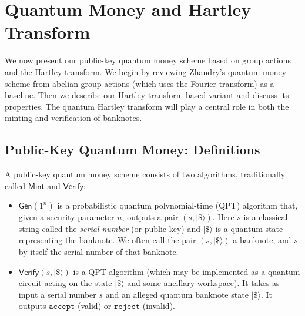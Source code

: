 \documentclass[12pt]{report}
\begin{document}





\chapter{Quantum Money and Hartley Transform}

We now present our public-key quantum money scheme based on group actions and the Hartley transform. We begin by reviewing Zhandry’s quantum money scheme from abelian group actions (which uses the Fourier transform) as a baseline. Then we describe our Hartley-transform-based variant and discuss its properties. The quantum Hartley transform will play a central role in both the minting and verification of banknotes.

\section{Public-Key Quantum Money: Definitions}
A public-key quantum money scheme consists of two algorithms, traditionally called $\mathsf{Mint}$ and $\mathsf{Verify}$:
\begin{itemize}
    \item $\mathsf{Gen}(1^n)$ is a probabilistic quantum polynomial-time (QPT) algorithm that, given a security parameter $n$, outputs a pair $(s, |\$\rangle)$. Here $s$ is a classical string called the \emph{serial number} (or public key) and $|\$\rangle$ is a quantum state representing the banknote. We often call the pair $(s, |\$\rangle)$ a banknote, and $s$ by itself the serial number of that banknote.
    \item $\mathsf{Verify}(s, |\$\rangle)$ is a QPT algorithm (which may be implemented as a quantum circuit acting on the state $|\$\rangle$ and some ancillary workspace). It takes as input a serial number $s$ and an alleged quantum banknote state $|\$\rangle$. It outputs $\mathtt{accept}$ (valid) or $\mathtt{reject}$ (invalid).
\end{itemize}
\end{document}

